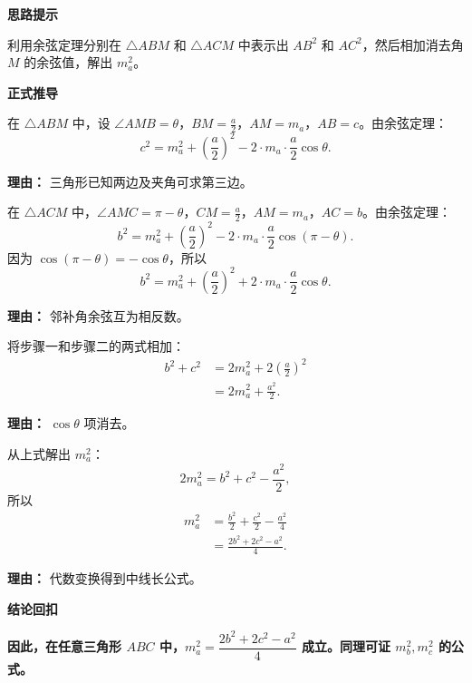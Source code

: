 \begin{proofbox}
	\textbf{\textcolor{CProof}{思路提示}}

	利用余弦定理分别在 $\triangle ABM$ 和 $\triangle ACM$ 中表示出 $AB^2$ 和 $AC^2$，然后相加消去角 $M$ 的余弦值，解出 $m_a^2$。

	\medskip
	\textbf{\textcolor{CProof}{正式推导}}
	\begin{description}[style=nextline, leftmargin=2.8em, labelsep=0.5em, itemsep=0.55em]
		\item[\textbf{步骤一（余弦定理应用1）：}] 在 $\triangle ABM$ 中，设 $\angle AMB = \theta$，$BM = \frac{a}{2}$，$AM = m_a$，$AB = c$。由余弦定理：
			\[
				c^2 = m_a^2 + \left(\frac{a}{2}\right)^2 - 2 \cdot m_a \cdot \frac{a}{2} \cos\theta.
			\]
			\par\textbf{理由：} 三角形已知两边及夹角可求第三边。

		\item[\textbf{步骤二（余弦定理应用2）：}] 在 $\triangle ACM$ 中，$\angle AMC = \pi - \theta$，$CM = \frac{a}{2}$，$AM = m_a$，$AC = b$。由余弦定理：
			\[
				b^2 = m_a^2 + \left(\frac{a}{2}\right)^2 - 2 \cdot m_a \cdot \frac{a}{2} \cos(\pi - \theta).
			\]
			因为 $\cos(\pi - \theta) = -\cos\theta$，所以
			\[
				b^2 = m_a^2 + \left(\frac{a}{2}\right)^2 + 2 \cdot m_a \cdot \frac{a}{2} \cos\theta.
			\]
			\par\textbf{理由：} 邻补角余弦互为相反数。

		\item[\textbf{步骤三（两式相加）：}] 将步骤一和步骤二的两式相加：
			\[
				\begin{aligned}
					b^2 + c^2 &= 2 m_a^2 + 2 \left(\frac{a}{2}\right)^2 \\
					&= 2 m_a^2 + \frac{a^2}{2}.
			\end{aligned}
			\]
			\par\textbf{理由：} $\cos\theta$ 项消去。

		\item[\textbf{步骤四（整理得公式）：}] 从上式解出 $m_a^2$：
			\[
				2 m_a^2 = b^2 + c^2 - \frac{a^2}{2},
			\]
			所以
			\[
				\begin{aligned}
					m_a^2 &= \frac{b^2}{2} + \frac{c^2}{2} - \frac{a^2}{4} \\
					&= \frac{2b^2 + 2c^2 - a^2}{4}.
			\end{aligned}
			\]
			\par\textbf{理由：} 代数变换得到中线长公式。
	\end{description}

	\medskip
	\textbf{\textcolor{CProof}{结论回扣}}

	\textbf{因此，在任意三角形 $ABC$ 中，$m_a^2 = \dfrac{2b^2+2c^2-a^2}{4}$ 成立。同理可证 $m_b^2,m_c^2$ 的公式。}
\end{proofbox}

